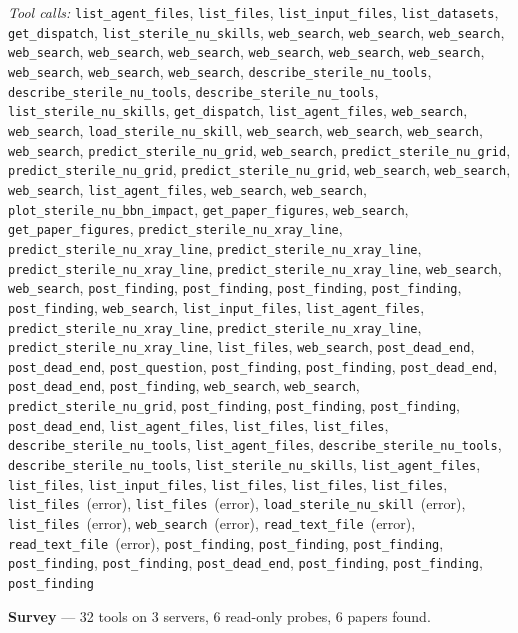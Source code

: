 \documentclass[11pt,a4paper]{article}
\begin{document}
\textit{Tool calls:} \texttt{list\_agent\_files}, \texttt{list\_files}, \texttt{list\_input\_files}, \texttt{list\_datasets}, \texttt{get\_dispatch}, \texttt{list\_sterile\_nu\_skills}, \texttt{web\_search}, \texttt{web\_search}, \texttt{web\_search}, \texttt{web\_search}, \texttt{web\_search}, \texttt{web\_search}, \texttt{web\_search}, \texttt{web\_search}, \texttt{web\_search}, \texttt{web\_search}, \texttt{web\_search}, \texttt{web\_search}, \texttt{describe\_sterile\_nu\_tools}, \texttt{describe\_sterile\_nu\_tools}, \texttt{describe\_sterile\_nu\_tools}, \texttt{list\_sterile\_nu\_skills}, \texttt{get\_dispatch}, \texttt{list\_agent\_files}, \texttt{web\_search}, \texttt{web\_search}, \texttt{load\_sterile\_nu\_skill}, \texttt{web\_search}, \texttt{web\_search}, \texttt{web\_search}, \texttt{web\_search}, \texttt{predict\_sterile\_nu\_grid}, \texttt{web\_search}, \texttt{predict\_sterile\_nu\_grid}, \texttt{predict\_sterile\_nu\_grid}, \texttt{predict\_sterile\_nu\_grid}, \texttt{web\_search}, \texttt{web\_search}, \texttt{web\_search}, \texttt{list\_agent\_files}, \texttt{web\_search}, \texttt{web\_search}, \texttt{plot\_sterile\_nu\_bbn\_impact}, \texttt{get\_paper\_figures}, \texttt{web\_search}, \texttt{get\_paper\_figures}, \texttt{predict\_sterile\_nu\_xray\_line}, \texttt{predict\_sterile\_nu\_xray\_line}, \texttt{predict\_sterile\_nu\_xray\_line}, \texttt{predict\_sterile\_nu\_xray\_line}, \texttt{predict\_sterile\_nu\_xray\_line}, \texttt{web\_search}, \texttt{web\_search}, \texttt{post\_finding}, \texttt{post\_finding}, \texttt{post\_finding}, \texttt{post\_finding}, \texttt{post\_finding}, \texttt{web\_search}, \texttt{list\_input\_files}, \texttt{list\_agent\_files}, \texttt{predict\_sterile\_nu\_xray\_line}, \texttt{predict\_sterile\_nu\_xray\_line}, \texttt{predict\_sterile\_nu\_xray\_line}, \texttt{list\_files}, \texttt{web\_search}, \texttt{post\_dead\_end}, \texttt{post\_dead\_end}, \texttt{post\_question}, \texttt{post\_finding}, \texttt{post\_finding}, \texttt{post\_dead\_end}, \texttt{post\_dead\_end}, \texttt{post\_finding}, \texttt{web\_search}, \texttt{web\_search}, \texttt{predict\_sterile\_nu\_grid}, \texttt{post\_finding}, \texttt{post\_finding}, \texttt{post\_finding}, \texttt{post\_dead\_end}, \texttt{list\_agent\_files}, \texttt{list\_files}, \texttt{list\_files}, \texttt{describe\_sterile\_nu\_tools}, \texttt{list\_agent\_files}, \texttt{describe\_sterile\_nu\_tools}, \texttt{describe\_sterile\_nu\_tools}, \texttt{list\_sterile\_nu\_skills}, \texttt{list\_agent\_files}, \texttt{list\_files}, \texttt{list\_input\_files}, \texttt{list\_files}, \texttt{list\_files}, \texttt{list\_files}, \texttt{list\_files}~(error), \texttt{list\_files}~(error), \texttt{load\_sterile\_nu\_skill}~(error), \texttt{list\_files}~(error), \texttt{web\_search}~(error), \texttt{read\_text\_file}~(error), \texttt{read\_text\_file}~(error), \texttt{post\_finding}, \texttt{post\_finding}, \texttt{post\_finding}, \texttt{post\_finding}, \texttt{post\_finding}, \texttt{post\_dead\_end}, \texttt{post\_finding}, \texttt{post\_finding}, \texttt{post\_finding}\par
\textbf{Survey} --- 32 tools on 3 servers, 6 read-only probes, 6 papers found.
\end{document}
